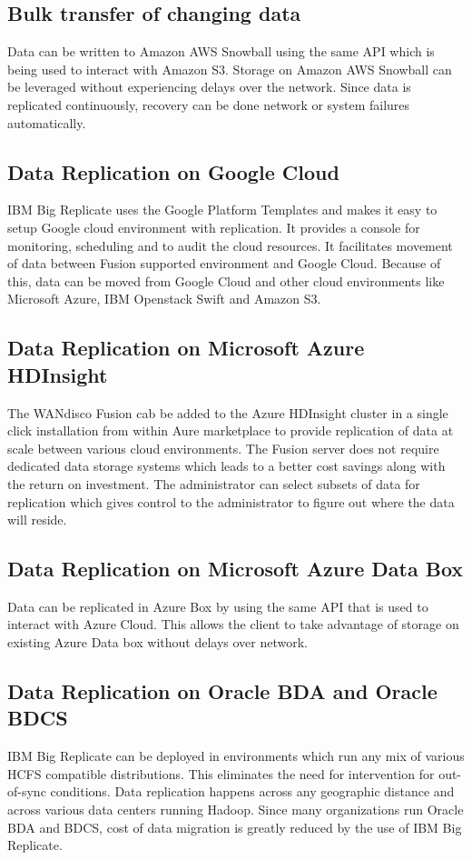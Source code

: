 \subsection{Bulk transfer of changing data}
Data can be written to Amazon AWS Snowball using the same API which is being
used to interact with Amazon S3. Storage on Amazon AWS Snowball can be leveraged
without experiencing delays over the network. Since data is replicated 
continuously, recovery can be done network or system failures automatically.

\subsection{Data Replication on Google Cloud}
IBM Big Replicate uses the Google Platform Templates and makes it easy to setup
Google cloud environment with replication. It provides a console for monitoring,
scheduling and to audit the cloud resources. It facilitates movement of data
between Fusion supported environment and Google Cloud. Because of this, data can
be moved from Google Cloud and other cloud environments like Microsoft Azure,
IBM Openstack Swift and Amazon S3.

\subsection{Data Replication on Microsoft Azure HDInsight}
The WANdisco Fusion cab be added to the Azure HDInsight cluster in a single
click installation from within Aure marketplace to provide replication of data
at scale between various cloud environments. The Fusion server does not require
dedicated data storage systems which leads to a better cost savings along with 
the return on investment. The administrator can select subsets of data for
replication which gives control to the administrator to figure out where the 
data will reside.

\subsection{Data Replication on Microsoft Azure Data Box}
Data can be replicated in Azure Box by using the same API that is used to
interact with Azure Cloud. This allows the client to take advantage of storage
on existing Azure Data box without delays over network.

\subsection{Data Replication on Oracle BDA and Oracle BDCS}
IBM Big Replicate can be deployed in environments which run any mix of various 
HCFS compatible distributions. This eliminates the need for intervention for 
out-of-sync conditions.	Data replication happens across any geographic distance
and across various data centers running Hadoop. Since many organizations run
Oracle BDA and BDCS, cost of data migration is greatly reduced by the use of 
IBM Big Replicate.


